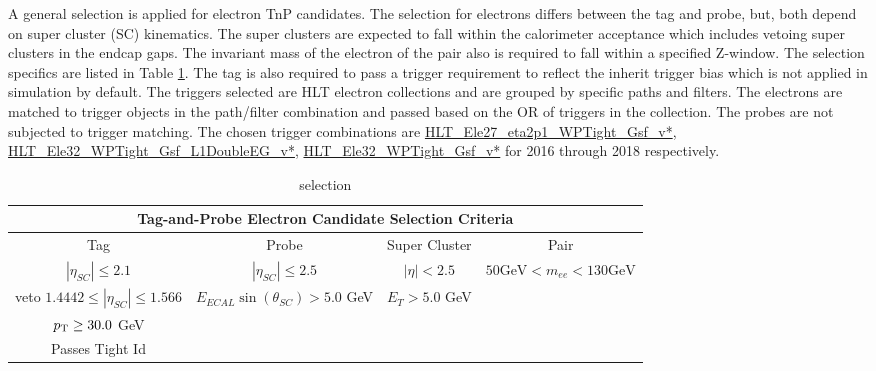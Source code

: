 A general selection is applied for electron TnP candidates. The selection for electrons differs between the tag and probe, but, both depend on super cluster (SC) kinematics. The super clusters are expected to fall within the calorimeter acceptance which includes vetoing super clusters in the endcap gaps. The invariant mass of the electron of the pair also is required to fall within a specified Z-window. The selection specifics are listed in Table \ref{tab:eleTnPSelect}.  The tag is also required to pass a trigger requirement to reflect the inherit trigger bias which is not applied in simulation by default. The triggers selected are HLT electron collections and are grouped by specific paths and filters. The electrons are matched to trigger objects in the path/filter combination and passed based on the OR of triggers in the collection. The probes are not subjected to trigger matching. The chosen trigger combinations are \url{HLT_Ele27_eta2p1_WPTight_Gsf_v*}, \url{HLT_Ele32_WPTight_Gsf_L1DoubleEG_v*}, \url{HLT_Ele32_WPTight_Gsf_v*} for 2016 through 2018 respectively.\\

\begin{table}
\caption{selection}
\label{tab:eleTnPSelect}
\begin{tabular}{|c|c|c|c|}
\hline 
\multicolumn{4}{|c|}{Tag-and-Probe Electron Candidate Selection Criteria} \\ 
\hline 
Tag & Probe & Super Cluster & Pair \\ 
\hline 
$|\eta_{SC}| \leq 2.1$ & $|\eta_{SC}| \leq 2.5$  & $|\eta|<2.5 $ & $50 \text{GeV} < m_{ee} < 130 \text{GeV} $ \\
veto $ 1.4442 \leq |\eta_{SC}| \leq 1.566 $ & $E_{ECAL}\sin(\theta_{SC}) > 5.0 $ GeV & $E_T > 5.0 $ GeV &  \\
 $p_{\mathrm{T}} \geq 30.0$ GeV &  &  &  \\
 Passes Tight Id &  &  & \\
\hline 
\end{tabular} 
\end{table}





